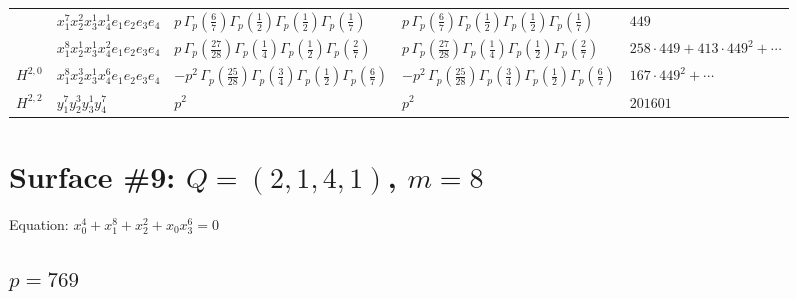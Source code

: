 \documentclass[11pt]{article}
\begin{document}
\begin{table}[ht]
{\begin{tabular}{@{}lllll@{}}
 & $x_{1}^{7} x_{2}^{2} x_{3}^{1} x_{4}^{1}  e_{1} e_{2} e_{3} e_{4}$ & $p \, \Gamma_p \left( \frac{6}{7} \right) \Gamma_p \left( \frac{1}{2} \right) \Gamma_p \left( \frac{1}{2} \right) \Gamma_p \left( \frac{1}{7} \right)$ & $p \, \Gamma_p \left( \frac{6}{7} \right) \Gamma_p \left( \frac{1}{2} \right) \Gamma_p \left( \frac{1}{2} \right) \Gamma_p \left( \frac{1}{7} \right)$ & $449$ \\
 & $x_{1}^{8} x_{2}^{1} x_{3}^{1} x_{4}^{2}  e_{1} e_{2} e_{3} e_{4}$ & $p \, \Gamma_p \left( \frac{27}{28} \right) \Gamma_p \left( \frac{1}{4} \right) \Gamma_p \left( \frac{1}{2} \right) \Gamma_p \left( \frac{2}{7} \right)$ & $p \, \Gamma_p \left( \frac{27}{28} \right) \Gamma_p \left( \frac{1}{4} \right) \Gamma_p \left( \frac{1}{2} \right) \Gamma_p \left( \frac{2}{7} \right)$ & $258{\cdot}449{+}413{\cdot}449^{2}{+}\cdots$ \\
\midrule
$H^{2,0}$ & $x_{1}^{8} x_{2}^{3} x_{3}^{1} x_{4}^{6}  e_{1} e_{2} e_{3} e_{4}$ & $- p^{2} \, \Gamma_p \left( \frac{25}{28} \right) \Gamma_p \left( \frac{3}{4} \right) \Gamma_p \left( \frac{1}{2} \right) \Gamma_p \left( \frac{6}{7} \right)$ & $- p^{2} \, \Gamma_p \left( \frac{25}{28} \right) \Gamma_p \left( \frac{3}{4} \right) \Gamma_p \left( \frac{1}{2} \right) \Gamma_p \left( \frac{6}{7} \right)$ & $167{\cdot}449^{2}{+}\cdots$ \\
\midrule
$H^{2,2}$ & $y_{1}^{7} y_{2}^{3} y_{3}^{1} y_{4}^{7}$ & $p^{2} \,$ & $p^{2} \,$ & $201601$ \\
\bottomrule
\end{tabular}
}
\renewcommand{\arraystretch}{1.0}
\end{table}

\newpage

\section*{Surface \#9: $Q=(2, 1, 4, 1)$, $m=8$}

Equation: $x_0^{4} + x_1^{8} + x_2^{2} + x_0 x_3^{6} = 0$

\subsection*{$p = 769$}
\end{document}
